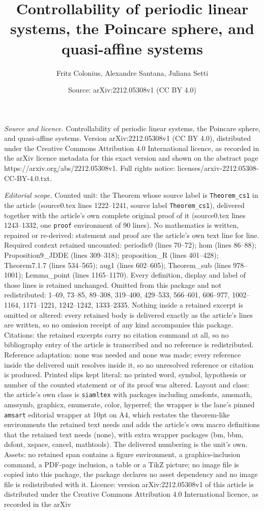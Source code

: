 \documentclass[10pt,a4paper]{amsart}
\title[Controllability of periodic linear systems, the Poincare sph]{Controllability of periodic linear systems, the Poincare sphere, and quasi-affine systems}
\author{Fritz Colonius, Alexandre Santana, Juliana Setti}
\date{Source: arXiv:2212.05308v1 (CC BY 4.0)}
\begin{document}
\maketitle

\noindent\emph{Source and licence.} Controllability of periodic linear systems, the Poincare sphere, and quasi-affine systems. Version arXiv:2212.05308v1 (CC BY 4.0), distributed under the Creative Commons Attribution 4.0 International licence, as recorded in the arXiv licence metadata for this exact version and shown on the abstract page https://arxiv.org/abs/2212.05308v1. Full rights notice: licenses/arxiv-2212.05308-CC-BY-4.0.txt.\par\smallskip

\noindent\textit{Editorial scope.} Counted unit: the Theorem whose source label is \texttt{Theorem\_cs1} in the article (source0.tex lines 1222--1241, source label \texttt{Theorem\_cs1}), delivered together with the article's own complete original proof of it (source0.tex lines 1243--1332, one \texttt{proof} environment of 90 lines). No mathematics is written, repaired or re-derived: statement and proof are the article's own text line for line. Required context retained uncounted: periodic0 (lines 70--72); hom (lines 86--88); Proposition9\_JDDE (lines 309--318); proposition\_R (lines 401--428); Theorem7.1.7 (lines 534--565); aug1 (lines 602--605); Theorem\_sub (lines 978--1001); Lemma\_point (lines 1165--1170). Every definition, display and label of those lines is retained unchanged. Omitted from this package and not redistributed: 1--69, 73--85, 89--308, 319--400, 429--533, 566--601, 606--977, 1002--1164, 1171--1221, 1242--1242, 1333--2335. Nothing inside a retained excerpt is omitted or altered: every retained body is delivered exactly as the article's lines are written, so no omission receipt of any kind accompanies this package. Citations: the retained excerpts carry no citation command at all, so no bibliography entry of the article is transcribed and no reference is redistributed. Reference adaptation: none was needed and none was made; every reference inside the delivered unit resolves inside it, so no unresolved reference or citation is produced. Printed slips kept literal: no printed word, symbol, hypothesis or number of the counted statement or of its proof was altered. Layout and class: the article's own class is \texttt{siamltex} with packages including amsfonts, amsmath, amssymb, graphicx, enumerate, color, hyperref; the wrapper is the lane's pinned \texttt{amsart} editorial wrapper at 10pt on A4, which restates the theorem-like environments the retained text needs and adds the article's own macro definitions that the retained text needs (none), with extra wrapper packages (bm, bbm, dsfont, xspace, cancel, mathtools). The delivered numbering is the unit's own. Assets: no retained span contains a figure environment, a graphics-inclusion command, a PDF-page inclusion, a table or a TikZ picture; no image file is copied into this package, the package declares no asset dependency and no image file is redistributed with it. Licence: version arXiv:2212.05308v1 of this article is distributed under the Creative Commons Attribution 4.0 International licence, as recorded in the arXiv 
\end{document}

